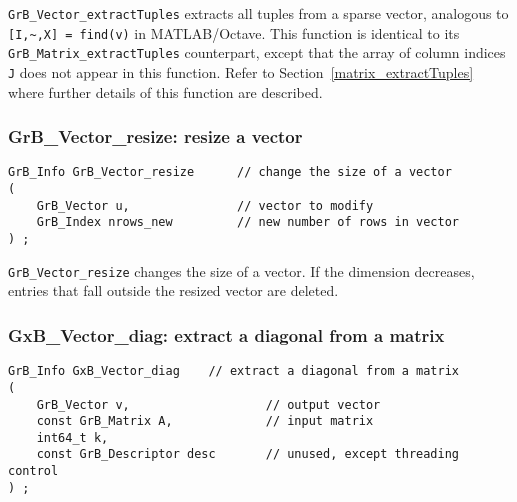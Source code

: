 \documentclass[12pt]{article}
\begin{document}
\verb'GrB_Vector_extractTuples' extracts all tuples from a sparse vector,
analogous to \verb'[I,~,X] = find(v)' in MATLAB/Octave.  This function is
identical to its \verb'GrB_Matrix_extractTuples' counterpart, except that the
array of column indices \verb'J' does not appear in this function.  Refer to
Section~\ref{matrix_extractTuples} where further details of this function are
described.

\newpage
\subsubsection{{\sf GrB\_Vector\_resize:}          resize a vector}
\label{vector_resize}

\begin{mdframed}[userdefinedwidth=6in]
{\footnotesize
\begin{verbatim}
GrB_Info GrB_Vector_resize      // change the size of a vector
(
    GrB_Vector u,               // vector to modify
    GrB_Index nrows_new         // new number of rows in vector
) ;
\end{verbatim} } \end{mdframed}

\verb'GrB_Vector_resize' changes the size of a vector.  If the dimension
decreases, entries that fall outside the resized vector are deleted.

\subsubsection{{\sf GxB\_Vector\_diag:} extract a diagonal from a matrix}
\label{vector_diag}

\begin{mdframed}[userdefinedwidth=6in]
{\footnotesize
\begin{verbatim}
GrB_Info GxB_Vector_diag    // extract a diagonal from a matrix
(
    GrB_Vector v,                   // output vector
    const GrB_Matrix A,             // input matrix
    int64_t k,
    const GrB_Descriptor desc       // unused, except threading control
) ;
\end{verbatim} } \end{mdframed}
\end{document}
